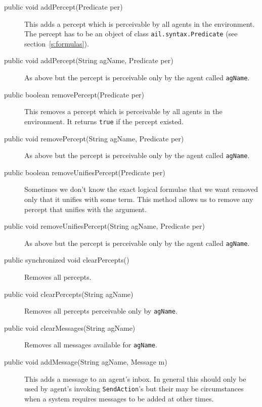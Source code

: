\begin{description}
\item[public void addPercept(Predicate per)] This adds a percept which is perceivable by all agents in the environment.  The percept has to be an object of class \texttt{ail.syntax.Predicate} (see section~\ref{s:formulas}).
\item[public void addPercept(String agName, Predicate per)] As above but the percept is perceivable only by the agent called \texttt{agName}.
\item[public boolean removePercept(Predicate per)] This removes a percept which is perceivable by all agents in the environment.  It returns \texttt{true} if the percept existed.
\item[public void removePercept(String agName, Predicate per)] As above but the percept is perceivable only by the agent called \texttt{agName}.
\item[public boolean removeUnifiesPercept(Predicate per)]  Sometimes we don't know the exact logical formulae that we want removed only that it unifies with some term.  This method allows us to remove any percept that unifies with the argument.
\item[public void removeUnifiesPercept(String agName, Predicate per)] As above but the percept is perceivable only by the agent called \texttt{agName}.
\item[public synchronized void clearPercepts()] Removes all percepts.
\item[public void clearPercepts(String agName)] Removes all percepts perceivable only by \texttt{agName}.
\item[public void clearMessages(String agName)] Removes all messages available for \texttt{agName}.
\item[public void addMessage(String agName, Message m)] This adds a message to an agent's inbox.  In general this should only be used by agent's invoking \texttt{SendAction}'s but their may be circumstances when a system requires messages to be added at other times.
\end{description}

